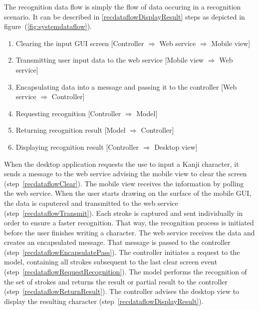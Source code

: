 The recognition data flow is simply the flow of data occuring in a recognition 
scenario. It can be described in \ref{recdataflowDisplayResult} steps
as depicted in figure~(\ref{fig:systemdataflow}).
\begin{enumerate}
  \item \label{recdataflowClear} 
        Clearing the input GUI screen 
        [Controller $\Rightarrow$ Web service $\Rightarrow$ Mobile view]
  \item \label{recdataflowTransmit} 
        Transmitting user input data to the web service 
        [Mobile view $\Rightarrow$ Web service]
  \item \label{recdataflowEncapsulatePass} 
        Encapsulating data into a message and passing 
        it to the controller 
        [Web service $\Rightarrow$ Controller]
  \item \label{recdataflowRequestRecognition} 
        Requesting recognition 
        [Controller $\Rightarrow$ Model] 
  \item \label{recdataflowReturnResult} 
        Returning recognition result 
        [Model $\Rightarrow$ Controller] 
  \item \label{recdataflowDisplayResult} %
        Displaying recognition result 
        [Controller $\Rightarrow$ Desktop view]
\end{enumerate}
When the desktop application requests the use to input a Kanji 
character, it sends a message to the web service advising the mobile view to 
clear the screen (step~\ref{recdataflowClear}). 
The mobile view receives the information by polling the web service. 
When the user starts drawing on the surface of the mobile GUI, the data is 
caputered and transmitted to the web service (step~\ref{recdataflowTransmit}).
Each stroke is captured and sent individually in order to ensure a faster 
recognition. That way, the recognition process is initiated before the
user finishes writing a character. The web service receives the data and 
creates an encapsulated message. That message is passed to the 
controller (step~\ref{recdataflowEncapsulatePass}).
The controller initiates a request to the model, containing all strokes
subsequent to the last clear screen 
event (step~\ref{recdataflowRequestRecognition}).
The model performs the recognition of the set of strokes and returns the result
or partial result to the controller (step~\ref{recdataflowReturnResult}).
The controller advises the desktop view to display the resulting character
(step~\ref{recdataflowDisplayResult}).

